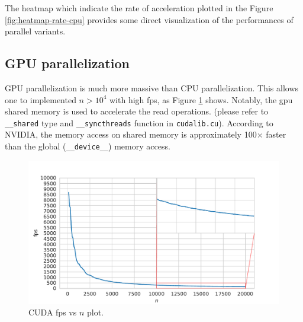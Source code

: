 \documentclass[twoside,12pt]{article}
\theoremstyle{definition}
\theoremstyle{remark}
\begin{document}
The heatmap which indicate the rate of acceleration plotted in the Figure \ref{fig:heatmap-rate-cpu} 
provides some direct visualization of the performances of parallel variants.


\subsection{GPU parallelization}
GPU parallelization is much more massive than CPU parallelization.
This allows one to implemented $n>10^4$ with high fps, as Figure \ref{fig:fps-dim-gpu}
shows.
Notably, the gpu shared memory is used to accelerate the read operations.
(please refer to \lstinline|__shared| type and \lstinline|__syncthreads| function
in \lstinline|cudalib.cu|).
According to NVIDIA, the memory access on shared memory is
approximately 100$\times$ faster than the global (\lstinline|__device__|) memory access.

\begin{figure}[t!]
    \centering
    \includegraphics[width=\textwidth]{../analysis/fps-dim-gpu.pdf}
    \caption{CUDA fps vs $n$ plot.}
    \label{fig:fps-dim-gpu}
\end{figure}
\end{document}
